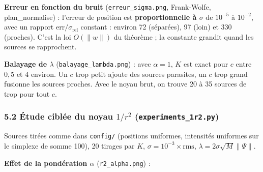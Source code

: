 \documentclass[
  french,
]{article}
\begin{document}
\textbf{Erreur en fonction du bruit} (\texttt{erreur\_sigma.png},
Frank-Wolfe, plan\_normalise) : l'erreur de position est
\textbf{proportionnelle à \(\sigma\)} de \(10^{-5}\) à \(10^{-2}\), avec
un rapport \(\text{err}/\sigma_{\mathrm{rel}}\) constant : environ 72
(séparées), 97 (loin) et 330 (proches). C'est la loi
\(O(\lVert w\rVert)\) du théorème ; la constante grandit quand les
sources se rapprochent.

\textbf{Balayage de \(\lambda\)} (\texttt{balayage\_lambda.png}) : avec
\(\alpha = 1\), \(K\) est exact pour \(c\) entre \(0{,}5\) et \(4\)
environ. Un \(c\) trop petit ajoute des sources parasites, un \(c\) trop
grand fusionne les sources proches. Avec le noyau brut, on trouve 20 à
35 sources de trop pour tout \(c\).

\subsubsection{\texorpdfstring{5.2 Étude ciblée du noyau \(1/r^2\)
(\texttt{experiments\_1r2.py})}{5.2 Étude ciblée du noyau 1/r\^{}2 (experiments\_1r2.py)}}\label{uxe9tude-cibluxe9e-du-noyau-1r2-experiments_1r2.py}

Sources tirées comme dans \texttt{config/} (positions uniformes,
intensités uniformes sur le simplexe de somme 100), 20 tirages par
\(K\), \(\sigma = 10^{-3}\times\mathrm{rms}\),
\(\lambda = 2\sigma\sqrt{M}\lVert\Psi\rVert\).

\textbf{Effet de la pondération \(\alpha\)} (\texttt{r2\_alpha.png}) :
\end{document}

